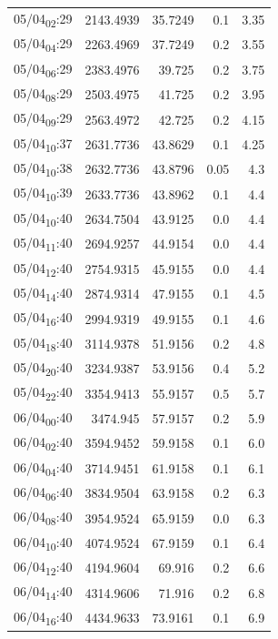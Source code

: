 \documentclass[11pt]{article}
\begin{document}
\begin{center}
\begin{tabular}{lrrrr}
05/04\textsubscript{02}:29 & 2143.4939 & 35.7249 & 0.1 & 3.35\\[0pt]
05/04\textsubscript{04}:29 & 2263.4969 & 37.7249 & 0.2 & 3.55\\[0pt]
05/04\textsubscript{06}:29 & 2383.4976 & 39.725 & 0.2 & 3.75\\[0pt]
05/04\textsubscript{08}:29 & 2503.4975 & 41.725 & 0.2 & 3.95\\[0pt]
05/04\textsubscript{09}:29 & 2563.4972 & 42.725 & 0.2 & 4.15\\[0pt]
05/04\textsubscript{10}:37 & 2631.7736 & 43.8629 & 0.1 & 4.25\\[0pt]
05/04\textsubscript{10}:38 & 2632.7736 & 43.8796 & 0.05 & 4.3\\[0pt]
05/04\textsubscript{10}:39 & 2633.7736 & 43.8962 & 0.1 & 4.4\\[0pt]
05/04\textsubscript{10}:40 & 2634.7504 & 43.9125 & 0.0 & 4.4\\[0pt]
05/04\textsubscript{11}:40 & 2694.9257 & 44.9154 & 0.0 & 4.4\\[0pt]
05/04\textsubscript{12}:40 & 2754.9315 & 45.9155 & 0.0 & 4.4\\[0pt]
05/04\textsubscript{14}:40 & 2874.9314 & 47.9155 & 0.1 & 4.5\\[0pt]
05/04\textsubscript{16}:40 & 2994.9319 & 49.9155 & 0.1 & 4.6\\[0pt]
05/04\textsubscript{18}:40 & 3114.9378 & 51.9156 & 0.2 & 4.8\\[0pt]
05/04\textsubscript{20}:40 & 3234.9387 & 53.9156 & 0.4 & 5.2\\[0pt]
05/04\textsubscript{22}:40 & 3354.9413 & 55.9157 & 0.5 & 5.7\\[0pt]
06/04\textsubscript{00}:40 & 3474.945 & 57.9157 & 0.2 & 5.9\\[0pt]
06/04\textsubscript{02}:40 & 3594.9452 & 59.9158 & 0.1 & 6.0\\[0pt]
06/04\textsubscript{04}:40 & 3714.9451 & 61.9158 & 0.1 & 6.1\\[0pt]
06/04\textsubscript{06}:40 & 3834.9504 & 63.9158 & 0.2 & 6.3\\[0pt]
06/04\textsubscript{08}:40 & 3954.9524 & 65.9159 & 0.0 & 6.3\\[0pt]
06/04\textsubscript{10}:40 & 4074.9524 & 67.9159 & 0.1 & 6.4\\[0pt]
06/04\textsubscript{12}:40 & 4194.9604 & 69.916 & 0.2 & 6.6\\[0pt]
06/04\textsubscript{14}:40 & 4314.9606 & 71.916 & 0.2 & 6.8\\[0pt]
06/04\textsubscript{16}:40 & 4434.9633 & 73.9161 & 0.1 & 6.9\\[0pt]

\end{tabular}
\end{center}
\end{document}
